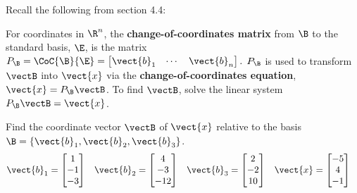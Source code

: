 \begin{boxdef}
	Recall the following from section 4.4:
	
	For coordinates in $\R^n$, the \textbf{change-of-coordinates matrix} from $\B$ to the standard basis, $\E$, is the matrix $P_\B=\CoC{\B}{\E}=\begin{bmatrix}\vect{b}_1&\cdots&\vect{b}_n\end{bmatrix}.$
	$P_\B$ is used to transform $\vectB$ into $\vect{x}$ via the \textbf{change-of-coordinates equation}, $\vect{x}=P_\B\vectB$. To find $\vectB$, solve the linear system $P_\B\vectB=\vect{x}$.
\end{boxdef}

\begin{exercise} %
	Find the coordinate vector $\vectB$ of $\vect{x}$ relative to the basis $\B=\{\vect{b}_1,\vect{b}_2,\vect{b}_3\}$.
	\begin{align*}
	\vect{b}_1 &= \begin{bmatrix}1\\-1\\-3\end{bmatrix} &
	\vect{b}_2 &= \begin{bmatrix}4\\-3\\-12\end{bmatrix} &
	\vect{b}_3 &= \begin{bmatrix}2\\-2\\10\end{bmatrix} &
	\vect{x} &= \begin{bmatrix}-5\\4\\-1\end{bmatrix}
	\end{align*}
\end{exercise}
\vfill


